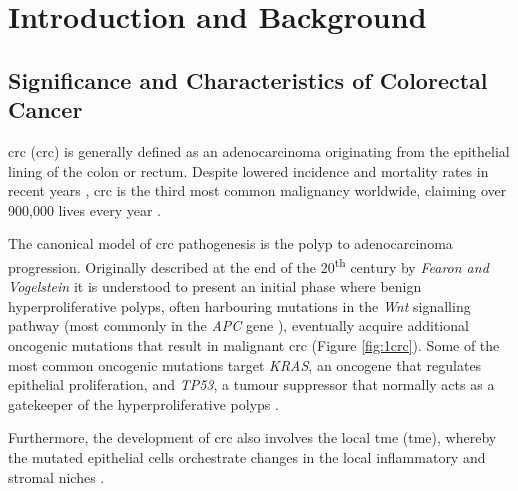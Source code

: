 \chapter{Introduction and Background}
\label{01intro}







\section{Significance and Characteristics of Colorectal Cancer}

\acrlong{crc} (\acrshort{crc}) is generally defined as an adenocarcinoma originating from the epithelial lining of the colon or rectum. Despite lowered incidence and mortality rates in recent years \cite{cronin_annual_2022}, \acrshort{crc} is the third most common malignancy worldwide, claiming over 900,000 lives every year \cite{morgan_global_2023}.

The canonical model of \acrshort{crc} pathogenesis is the polyp to adenocarcinoma progression. Originally described at the end of the 20\textsuperscript{th} century by \emph{Fearon and Vogelstein} \cite{fearon_genetic_1990} it is understood to present an initial phase where benign hyperproliferative polyps, often harbouring mutations in the \emph{Wnt} signalling pathway (most commonly in the \emph{APC} gene \cite{aghabozorgi_role_2019}), eventually acquire additional oncogenic mutations that result in malignant \acrshort{crc} (Figure \ref{fig:1crc}). Some of the most common oncogenic mutations target \emph{KRAS}, an oncogene that regulates epithelial proliferation, and \emph{TP53}, a tumour suppressor that normally acts as a gatekeeper of the hyperproliferative polyps \cite{fearon_genetic_1990,armaghany_genetic_2012}. 

Furthermore, the development of \acrshort{crc} also involves the local \acrlong{tme} (\acrshort{tme}), whereby the mutated epithelial cells orchestrate changes in the local inflammatory and stromal niches \cite{peddareddigari_tumor_2010}.

